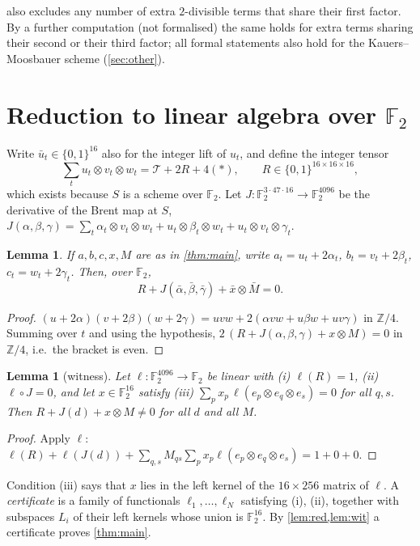 \documentclass[11pt]{article}
\numberwithin{equation}{section}
\newtheorem{lemma}[theorem]{Lemma}
\theoremstyle{definition}
\theoremstyle{remark}
\newcommand{\F}{\mathbb F}
\newcommand{\Z}{\mathbb Z}
\newcommand{\T}{\mathcal T}
\begin{document}
 also excludes any number of extra $2$-divisible terms that share their first factor.
By a further computation (not formalised) the same holds for extra terms sharing their second or their
third factor; all formal statements also hold for the Kauers--Moosbauer scheme (\cref{sec:other}).

\section{Reduction to linear algebra over $\F_2$}
Write $\bar u_t\in\{0,1\}^{16}$ also for the integer lift of $u_t$, and define the integer tensor
\[ \sum_t u_t\otimes v_t\otimes w_t = \T + 2R + 4(\ast),\qquad R\in\{0,1\}^{16\times16\times16}, \]
which exists because $S$ is a scheme over $\F_2$. Let $J:\F_2^{3\cdot 47\cdot 16}\to\F_2^{4096}$ be the
derivative of the Brent map at $S$,
$J(\alpha,\beta,\gamma)=\sum_t \alpha_t\otimes v_t\otimes w_t+u_t\otimes\beta_t\otimes w_t+u_t\otimes v_t\otimes\gamma_t$.

\begin{lemma}\label{lem:red}
If $a,b,c,x,M$ are as in \cref{thm:main}, write $a_t=u_t+2\alpha_t$, $b_t=v_t+2\beta_t$, $c_t=w_t+2\gamma_t$.
Then, over $\F_2$,
\[ R + J(\bar\alpha,\bar\beta,\bar\gamma) + \bar x\otimes\bar M = 0 . \]
\end{lemma}
\begin{proof}
$(u+2\alpha)(v+2\beta)(w+2\gamma)=uvw+2(\alpha vw+u\beta w+uv\gamma)$ in $\Z/4$. Summing over $t$ and using the
hypothesis, $2\,(R+J(\alpha,\beta,\gamma)+x\otimes M)=0$ in $\Z/4$, i.e.\ the bracket is even.
\end{proof}

\begin{lemma}[witness]\label{lem:wit}
Let $\ell:\F_2^{4096}\to\F_2$ be linear with (i) $\ell(R)=1$, (ii) $\ell\circ J=0$, and let
$x\in\F_2^{16}$ satisfy (iii) $\sum_{p}x_p\,\ell(e_p\otimes e_q\otimes e_s)=0$ for all $q,s$. Then
$R+J(d)+x\otimes M\neq0$ for all $d$ and all $M$.
\end{lemma}
\begin{proof}
Apply $\ell$: $\ell(R)+\ell(J(d))+\sum_{q,s}M_{qs}\sum_p x_p\ell(e_p\otimes e_q\otimes e_s)=1+0+0$.
\end{proof}

Condition (iii) says that $x$ lies in the left kernel of the $16\times256$ matrix of $\ell$. A
\emph{certificate} is a family of functionals $\ell_1,\dots,\ell_N$ satisfying (i), (ii), together with
subspaces $L_i$ of their left kernels whose union is $\F_2^{16}$. By \cref{lem:red,lem:wit} a certificate
proves \cref{thm:main}.
\end{document}
